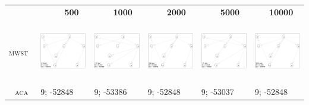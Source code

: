 \begin{table}[!p]
\vspace*{-\baselineskip}
\hspace*{-6mm}
\begin{tabular}{r@{}p{2.9cm}@{}p{2.9cm}@{}p{2.9cm}@{}p{2.9cm}@{}p{2.90cm}}
 & \textbf{~~~~~500} & \textbf{~~~~1000} & \textbf{~~~~2000} & \textbf{~~~~5000} & \textbf{~~~10000} \\
\textsc{mwst~} &
\includegraphics[width=29.34mm, height=26.7mm]{fig/MWST-ACA-500} &
\includegraphics[width=29.34mm, height=26.7mm]{fig/MWST-ACA-1000} &
\includegraphics[width=29.34mm, height=26.7mm]{fig/MWST-ACA-2000} &
\includegraphics[width=29.34mm, height=26.7mm]{fig/MWST-ACA-5000} &
\includegraphics[width=29.34mm, height=26.7mm]{fig/MWST-ACA-10000} \\
\textsc{aca~}
& 9; -52848 & 9; -53386 & 9; -52848 & 9; -53037 & 9; -52848 \\

\end{tabular}
\end{table}
